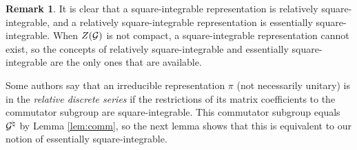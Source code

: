 \documentclass{article}
\theoremstyle{definition}
\newtheorem{rem}[thm]{Remark}
\numberwithin{equation}{section}
\renewcommand{\-}{\hyp{}}
\begin{document}
\begin{rem}
It is clear that a square-integrable representation is relatively square-integrable, and a relatively square-integrable representation is essentially square-integrable. When $Z(\mathcal{G})$ is not compact, a square-integrable representation cannot exist, so the concepts of relatively square-integrable and essentially square-integrable are the only ones that are available.

Some authors say that an irreducible representation $\pi$ (not necessarily unitary) is in the \emph{relative discrete series} if the restrictions of its matrix coefficients to the commutator subgroup are square-integrable. This commutator subgroup equals $\mathcal{G}^\natural$ by Lemma \ref{lem:comm}, so the next lemma shows that this is equivalent to our notion of essentially square-integrable.
\end{rem}
\end{document}

